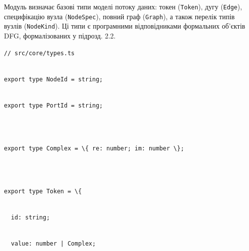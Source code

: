\documentclass[
]{article}
\newcommand{\passthrough}[1]{#1}
\begin{document}
Модуль визначає базові типи моделі потоку даних: токен
(\passthrough{\lstinline!Token!}), дугу
(\passthrough{\lstinline!Edge!}), специфікацію вузла
(\passthrough{\lstinline!NodeSpec!}), повний граф
(\passthrough{\lstinline!Graph!}), а також перелік типів вузлів
(\passthrough{\lstinline!NodeKind!}). Ці типи є програмними
відповідниками формальних об'єктів DFG, формалізованих у підрозд. 2.2.

\passthrough{\lstinline!//!}\passthrough{\lstinline! !}\passthrough{\lstinline!src!}\passthrough{\lstinline!/core/!}\passthrough{\lstinline!types.ts!}\strut \\
\passthrough{\lstinline!export!}\passthrough{\lstinline! !}\passthrough{\lstinline!type!}\passthrough{\lstinline! !}\passthrough{\lstinline!NodeId!}\passthrough{\lstinline! !}\passthrough{\lstinline!=!}\passthrough{\lstinline! !}\passthrough{\lstinline!string;!}\strut \\
\passthrough{\lstinline!export!}\passthrough{\lstinline! !}\passthrough{\lstinline!type!}\passthrough{\lstinline! !}\passthrough{\lstinline!PortId!}\passthrough{\lstinline! !}\passthrough{\lstinline!=!}\passthrough{\lstinline! !}\passthrough{\lstinline!string;!}\strut \\
\strut \\
\passthrough{\lstinline!export!}\passthrough{\lstinline! !}\passthrough{\lstinline!type!}\passthrough{\lstinline! !}\passthrough{\lstinline!Complex!}\passthrough{\lstinline! !}\passthrough{\lstinline!=!}\passthrough{\lstinline! !}\passthrough{\lstinline!\{!}\passthrough{\lstinline! !}\passthrough{\lstinline!re:!}\passthrough{\lstinline! !}\passthrough{\lstinline!number;!}\passthrough{\lstinline! !}\passthrough{\lstinline!im:!}\passthrough{\lstinline! !}\passthrough{\lstinline!number!}\passthrough{\lstinline! !}\passthrough{\lstinline!\};!}\strut \\
\strut \\
\passthrough{\lstinline!export!}\passthrough{\lstinline! !}\passthrough{\lstinline!type!}\passthrough{\lstinline! !}\passthrough{\lstinline!Token!}\passthrough{\lstinline! !}\passthrough{\lstinline!=!}\passthrough{\lstinline! !}\passthrough{\lstinline!\{!}\strut \\
\passthrough{\lstinline!  !}\passthrough{\lstinline!id:!}\passthrough{\lstinline! !}\passthrough{\lstinline!string;!}\strut \\
\passthrough{\lstinline!  !}\passthrough{\lstinline!value:!}\passthrough{\lstinline! !}\passthrough{\lstinline!number!}\passthrough{\lstinline! !}\passthrough{\lstinline!|!}\passthrough{\lstinline! !}\passthrough{\lstinline!Complex;!}\strut \\
\end{document}
